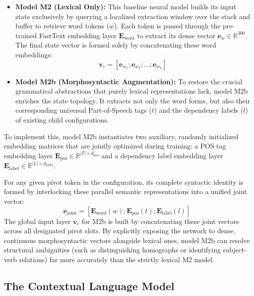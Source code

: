 \documentclass[12pt,a4paper]{article}
\begin{document}
\begin{itemize}
    \item \textbf{Model M2 (Lexical Only):} This baseline neural model builds its input state exclusively by querying a localized extraction window over the stack and buffer to retrieve word tokens ($w$). Each token is passed through the pre-trained FastText embedding layer $\mathbf{E}_{\text{word}}$ to extract its dense vector $\mathbf{e}_w \in \mathbb{R}^{300}$. The final state vector is formed solely by concatenating these word embeddings:
    \begin{equation}
        \mathbf{v}_c = \left[ \mathbf{e}_{w_1} ; \mathbf{e}_{w_2} ; \dots ; \mathbf{e}_{w_k} \right]
    \end{equation}
    
    \item \textbf{Model M2b (Morphosyntactic Augmentation):} To restore the crucial grammatical abstractions that purely lexical representations lack, model M2b enriches the state topology. It extracts not only the word forms, but also their corresponding universal Part-of-Speech tags ($t$) and the dependency labels ($l$) of existing child configurations.
\end{itemize}

To implement this, model M2b instantiates two auxiliary, randomly initialized embedding matrices that are jointly optimized during training: a POS tag embedding layer $\mathbf{E}_{\text{pos}} \in \mathbb{R}^{|T| \times d_{\text{pos}}}$ and a dependency label embedding layer $\mathbf{E}_{\text{label}} \in \mathbb{R}^{|L| \times d_{\text{label}}}$. 

For any given pivot token in the configuration, its complete syntactic identity is formed by interlocking these parallel semantic representations into a unified joint vector:
\begin{equation}
    \mathbf{e}_{\text{joint}} = \left[ \mathbf{E}_{\text{word}}(w) ; \mathbf{E}_{\text{pos}}(t) ; \mathbf{E}_{\text{label}}(l) \right]
    \label{eq:joint_embedding}
\end{equation}
The global input layer $\mathbf{v}_c$ for M2b is built by concatenating these joint vectors across all designated pivot slots. By explicitly exposing the network to dense, continuous morphosyntactic vectors alongside lexical ones, model M2b can resolve structural ambiguities (such as distinguishing homographs or identifying subject-verb relations) far more accurately than the strictly lexical M2 model.

\subsection{The Contextual Language Model}
\label{subsec:contextual_language_model}
\end{document}
